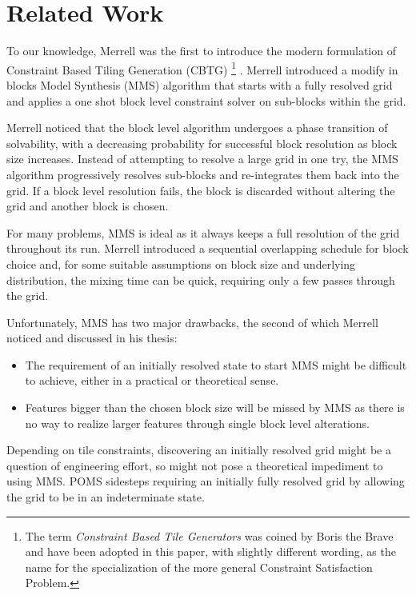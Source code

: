 \section{Related Work}

To our knowledge, Merrell was the first to introduce the modern formulation of Constraint Based Tiling Generation (CBTG)
\footnote{The term \textit{Constraint Based Tile Generators} was coined by Boris the Brave \cite{BorisTheBrave_cbtg_2021} and have been adopted in this paper,
with slightly different wording, as the name for the specialization of the more general Constraint Satisfaction Problem.}
\cite{Merrell_2007, Merrell_2009}.
Merrell introduced a modify in blocks Model Synthesis (MMS) algorithm that starts with a fully resolved grid
and applies a one shot block level constraint solver on sub-blocks within the grid.

Merrell noticed that the block level algorithm undergoes a phase transition of solvability, with a decreasing probability
for successful block resolution as block size increases.
Instead of attempting to resolve a large grid in one try, the MMS algorithm progressively resolves sub-blocks and re-integrates them back into the grid.
If a block level resolution fails, the block is discarded without altering the grid and another block is chosen.

For many problems, MMS is ideal as it always keeps a full resolution of the grid throughout its run.
Merrell introduced a sequential overlapping schedule for block choice and, for some suitable assumptions
on block size and underlying distribution, the mixing time can be quick, requiring only a few passes through the grid.

Unfortunately, MMS has two major drawbacks, the second of which Merrell noticed and discussed in his thesis:

\begin{itemize}
  \item The requirement of an initially resolved state to start MMS might be difficult to achieve, either in a practical
        or theoretical sense.
  \item Features bigger than the chosen block size will be missed by MMS as there is no way to realize larger features
        through single block level alterations.
\end{itemize}

Depending on tile constraints, discovering an initially resolved grid might be a question of engineering
effort, so might not pose a theoretical impediment to using MMS.
POMS sidesteps requiring an initially fully resolved grid by allowing the grid to be in an indeterminate state.

